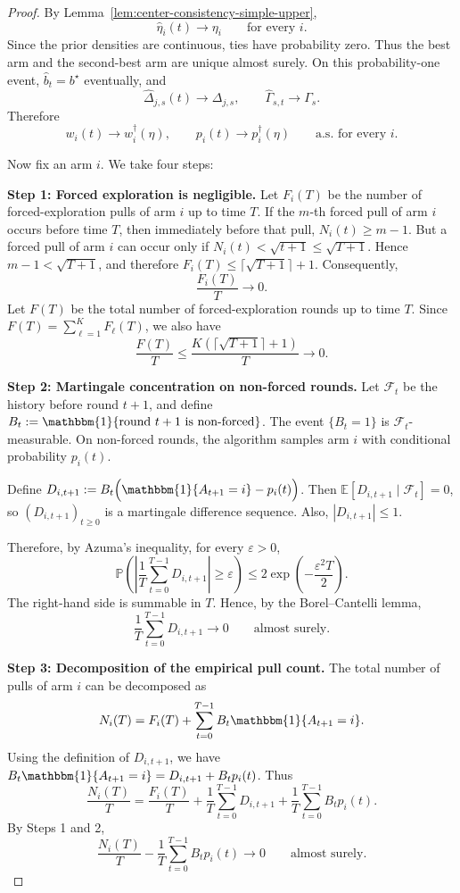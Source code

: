 \documentclass[10pt]{article}
\theoremstyle{plain}
\begin{document}
\begin{proof}
By Lemma~\ref{lem:center-consistency-simple-upper},
\[
    \widehat \eta_i(t)\to \eta_i
    \qquad\text{for every }i.
\]
Since the prior densities are continuous, ties have probability zero.  Thus the
best arm and the second-best arm are unique almost surely.  On this
probability-one event, $\widehat b_t=b^\star$
eventually, and
\[
    \widehat\Delta_{j,s}(t)\to\Delta_{j,s},
    \qquad
    \widehat\Gamma_{s,t}\to\Gamma_s.
\]
Therefore
\[
    w_i(t)\to w_i^\dagger(\eta),
    \qquad
    p_i(t)\to p_i^\dagger(\eta)
    \qquad\text{a.s. for every }i.
\]



Now fix an arm $i$. We take four steps:

\textbf{Step 1: Forced exploration is negligible.}
Let $F_i(T)$ be the number of forced-exploration pulls of arm $i$ up to time $T$.
If the $m$-th forced pull of arm $i$ occurs before time $T$, then immediately before that pull,
$N_i(t)\ge m-1$.
But a forced pull of arm $i$ can occur only if
$N_i(t)<\sqrt{t+1}\le \sqrt{T+1}$.
Hence
$m-1<\sqrt{T+1}$,
and therefore
$F_i(T)\le \lceil \sqrt{T+1}\rceil+1$.
Consequently,
\[
\frac{F_i(T)}{T}\to0.
\]
Let $F(T)$ be the total number of forced-exploration rounds up to time $T$. Since
$F(T)=\sum_{\ell=1}^K F_\ell(T)$,
we also have
\[
\frac{F(T)}{T}\le
\frac{K(\lceil\sqrt{T+1}\rceil+1)}{T}
\to0.
\]

\textbf{Step 2: Martingale concentration on non-forced rounds.}
Let $\mathcal F_t$ be the history before round $t+1$, and define
$B_t
:=
\mathbbm{1}\{\text{round }t+1\text{ is non-forced}\}$.
The event $\{B_t=1\}$ is $\mathcal F_t$-measurable. On non-forced rounds, the algorithm samples arm $i$ with conditional probability $p_i(t)$.

Define
$D_{i,t+1}
:=
B_t\Bigl(\mathbbm{1}\{A_{t+1}=i\}-p_i(t)\Bigr)$.
Then
$\mathbb E[D_{i,t+1}\mid \mathcal F_t]=0$,
so $(D_{i,t+1})_{t\ge0}$ is a martingale difference sequence. Also,
$|D_{i,t+1}|\le1$.

Therefore, by Azuma's inequality, for every $\varepsilon>0$,
\[
\mathbb P\left(
\left|
\frac1T\sum_{t=0}^{T-1}D_{i,t+1}
\right|
\ge \varepsilon
\right)
\le
2\exp\left(-\frac{\varepsilon^2T}{2}\right).
\]
The right-hand side is summable in $T$. Hence, by the Borel--Cantelli lemma,
\[
\frac1T\sum_{t=0}^{T-1}D_{i,t+1}\to0
\qquad\text{almost surely}.
\]

\textbf{Step 3: Decomposition of the empirical pull count.}
The total number of pulls of arm $i$ can be decomposed as
\[
N_i(T)
=
F_i(T)
+
\sum_{t=0}^{T-1}
B_t\mathbbm{1}\{A_{t+1}=i\}.
\]
Using the definition of $D_{i,t+1}$, we  have
$B_t\mathbbm{1}\{A_{t+1}=i\}
=
D_{i,t+1}+B_t p_i(t)$.
Thus
\[
\frac{N_i(T)}{T}
=
\frac{F_i(T)}{T}
+
\frac1T\sum_{t=0}^{T-1}D_{i,t+1}
+
\frac1T\sum_{t=0}^{T-1}B_t p_i(t).
\]
By Steps 1 and 2,
\[
\frac{N_i(T)}{T}
-
\frac1T\sum_{t=0}^{T-1}B_t p_i(t)
\to0
\qquad\text{almost surely}.
\]


\end{proof}
\end{document}
